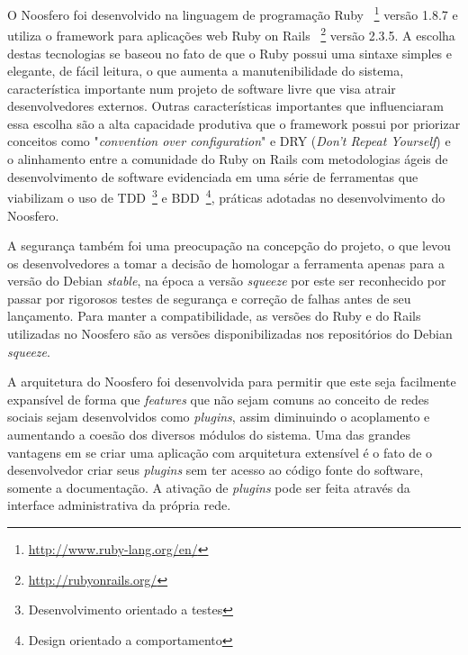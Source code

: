 
O Noosfero foi desenvolvido na linguagem de programação Ruby
~\footnote{\url{http://www.ruby-lang.org/en/}}
versão 1.8.7 e utiliza o framework para aplicações web Ruby on Rails
~\footnote{\url{http://rubyonrails.org/}}
versão 2.3.5.
%
A escolha destas tecnologias se baseou no fato de que o Ruby possui uma sintaxe
simples e elegante, de fácil leitura, o que aumenta a manutenibilidade do sistema,
característica importante num projeto de software livre que visa atrair
desenvolvedores externos. 
%
Outras características importantes que influenciaram essa escolha são a alta
capacidade produtiva que o framework possui por priorizar conceitos como
"\textit{convention over configuration}" e DRY (\textit{Don't Repeat Yourself})
e o alinhamento entre a comunidade do Ruby on Rails com metodologias ágeis de
desenvolvimento de software evidenciada em uma série de ferramentas que
viabilizam o uso de TDD~\footnote{Desenvolvimento orientado a testes}
e BDD~\footnote{Design orientado a comportamento}, práticas adotadas no
desenvolvimento do Noosfero.


A segurança também foi uma preocupação na concepção do projeto, o que levou os
desenvolvedores a tomar a decisão de homologar a ferramenta apenas para a
versão do Debian \textit{stable}, na época a versão \textit{squeeze} por este
ser reconhecido por passar por rigorosos testes de segurança e correção de
falhas antes de seu lançamento. 
%
Para manter a compatibilidade, as versões do Ruby e do Rails utilizadas no
Noosfero são as versões disponibilizadas nos repositórios do Debian
\textit{squeeze}.

A arquitetura do Noosfero foi desenvolvida para permitir que este seja facilmente
expansível de forma que \textit{features} que não sejam comuns ao conceito de
redes sociais sejam desenvolvidos como \textit{plugins}, assim diminuindo
o acoplamento e aumentando a coesão dos diversos módulos do sistema.
%
Uma das grandes vantagens em se criar uma aplicação com arquitetura extensível
é o fato de o desenvolvedor criar seus \textit{plugins}
sem ter acesso ao código fonte do software, somente a documentação. A
ativação de \textit{plugins} pode ser feita através da interface administrativa
da própria rede.

